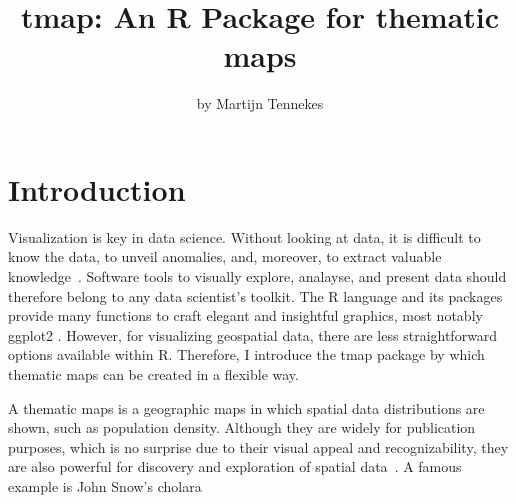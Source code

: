 \title{tmap: An R Package for thematic maps}
\author{by Martijn Tennekes}

\maketitle




\section{Introduction}

Visualization is key in data science. Without looking at data, it is difficult to know the data, to unveil anomalies, and, moreover, to extract valuable knowledge~\citep{tufte83}. Software tools to visually explore, analayse, and present data should therefore belong to any data scientist's toolkit. The R language and its packages provide many functions to craft elegant and insightful graphics, most notably ggplot2 \citep{ggplot2}. However, for visualizing geospatial data, there are less straightforward options available within R. Therefore, I introduce the tmap package by which thematic maps can be created in a flexible way.

A thematic maps is a geographic maps in which spatial data distributions are shown, such as population density. Although they are widely for publication purposes, which is no surprise due to their visual appeal and recognizability, they are also powerful for discovery and exploration of spatial data~\citep{friendly95}. A famous example is John Snow's cholara

